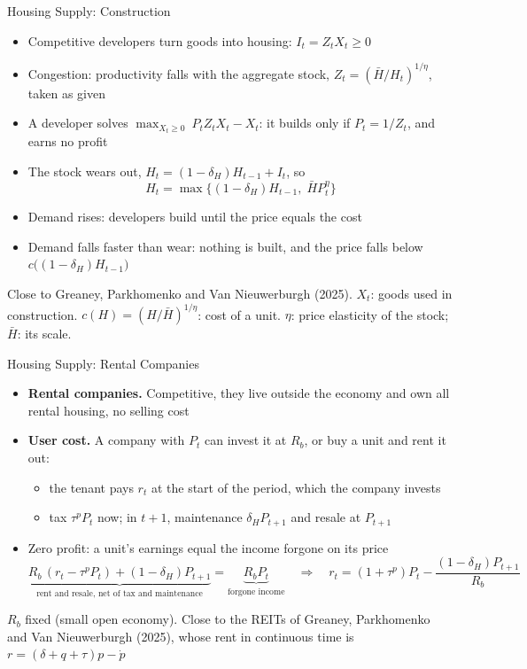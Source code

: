 \documentclass[11pt,aspectratio=169]{beamer}
\newcommand{\notation}[1]{\vfill{\linespread{0.95}\scriptsize\color{sourcegray}#1\par}}
\begin{document}
\begin{frame}[label=dev]{Housing Supply: Construction}
\footnotesize
\setlength{\abovedisplayskip}{3pt}\setlength{\belowdisplayskip}{3pt}
\begin{itemize}\setlength\itemsep{5pt}
  \item Competitive developers turn goods into housing: $I_t=Z_tX_t\ge0$
  \item Congestion: productivity falls with the aggregate stock, $Z_t=(\bar H/H_t)^{1/\eta}$, taken as given
  \item A developer solves $\max_{X_t\ge0}\ P_tZ_tX_t-X_t$: it builds only if $P_t=1/Z_t$, and earns no profit
  \item The stock wears out, $H_t=(1-\delta_H)H_{t-1}+I_t$, so
  \[
  H_t=\max\bigl\{(1-\delta_H)H_{t-1},\;\bar HP_t^{\eta}\bigr\}
  \]
  \item Demand rises: developers build until the price equals the cost
  \item Demand falls faster than wear: nothing is built, and the price falls below $c\bigl((1-\delta_H)H_{t-1}\bigr)$
\end{itemize}
\notation{Close to Greaney, Parkhomenko and Van Nieuwerburgh (2025). $X_t$: goods used in construction. $c(H)=(H/\bar H)^{1/\eta}$: cost of a unit. $\eta$: price elasticity of the stock; $\bar H$: its scale.}
\end{frame}

\begin{frame}{Housing Supply: Rental Companies}
\small
\setlength{\abovedisplayskip}{1pt}\setlength{\belowdisplayskip}{1pt}
\begin{itemize}\setlength\itemsep{0pt}
  \item \textbf{Rental companies.} Competitive, they live outside the economy and own all rental housing, no selling cost
  \item \textbf{User cost.} A company with $P_t$ can invest it at $R_b$, or buy a unit and rent it out:
  \begin{itemize}\setlength\itemsep{1pt}
    \item the tenant pays $r_t$ at the start of the period, which the company invests
    \item tax $\tau^pP_t$ now; in $t+1$, maintenance $\delta_HP_{t+1}$ and resale at $P_{t+1}$
  \end{itemize}
  \item Zero profit: a unit's earnings equal the income forgone on its price
  \[
  \underbrace{R_b\,(r_t-\tau^pP_t)+(1-\delta_H)P_{t+1}}_{\text{rent and resale, net of tax and maintenance}}=\underbrace{R_bP_t}_{\text{forgone income}}
  \quad\Rightarrow\quad r_t=(1+\tau^p)P_t-\frac{(1-\delta_H)P_{t+1}}{R_b}
  \]
\end{itemize}
\notation{$R_b$ fixed (small open economy). Close to the REITs of Greaney, Parkhomenko and Van Nieuwerburgh (2025), whose rent in continuous time is $r=(\delta+q+\tau)p-\dot p$}
\end{frame}
\end{document}
